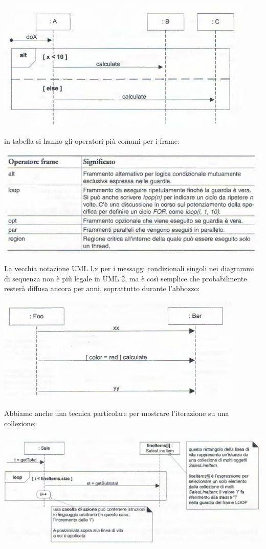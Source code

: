 \documentclass[a4paper,12pt, oneside]{book}
\begin{document}
\begin{center}
	\includegraphics[scale=0.7]{img/framed5.png}
\end{center}

in tabella si hanno gli operatori più comuni per i frame:
\begin{center}
	\includegraphics[scale=0.7]{img/farmed2.png}
\end{center}
La vecchia notazione UML l.x per i messaggi condizionali singoli nei diagrammi di sequenza non è più legale in UML 2, ma è così semplice che probabilmente resterà diffusa ancora per anni, soprattutto durante l'abbozzo:
\begin{center}
	\includegraphics[scale=0.6]{img/framed3.png}
\end{center}
Abbiamo anche una tecnica particolare per mostrare l'iterazione su una collezione:
\begin{center}
	\includegraphics[scale=0.7]{img/iterd.png}
\end{center}
\end{document}
